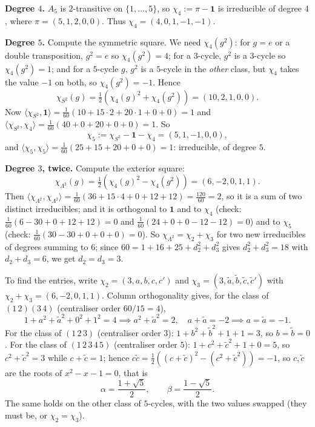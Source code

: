 \documentclass[a4paper]{scrartcl}
\newcommand{\ip}[2]{\langle #1, #2 \rangle}
\begin{document}
\textbf{Degree $4$.} $A_5$ is $2$-transitive on $\{1,\dots,5\}$, so $\chi_4 := \pi - \mathbf 1$ is irreducible of degree $4$, where $\pi = (5,1,2,0,0)$. Thus $\chi_4 = (4,0,1,-1,-1)$.

\textbf{Degree $5$.} Compute the symmetric square. We need $\chi_4(g^2)$: for $g = e$ or a double transposition, $g^2 = e$ so $\chi_4(g^2) = 4$; for a $3$-cycle, $g^2$ is a $3$-cycle so $\chi_4(g^2) = 1$; and for a $5$-cycle $g$, $g^2$ is a $5$-cycle in the \emph{other} class, but $\chi_4$ takes the value $-1$ on both, so $\chi_4(g^2) = -1$. Hence
$$\chi_{S^2}(g) = \tfrac12(\chi_4(g)^2 + \chi_4(g^2)) = (10, 2, 1, 0, 0).$$
Now $\ip{\chi_{S^2}}{\mathbf 1} = \frac1{60}(10 + 15\cdot2 + 20\cdot 1 + 0 + 0) = 1$ and $\ip{\chi_{S^2}}{\chi_4} = \frac1{60}(40 + 0 + 20 + 0 + 0) = 1$. So
$$\chi_5 := \chi_{S^2} - \mathbf 1 - \chi_4 = (5,1,-1,0,0),$$
and $\ip{\chi_5}{\chi_5} = \frac1{60}(25 + 15 + 20 + 0 + 0) = 1$: irreducible, of degree $5$.

\textbf{Degree $3$, twice.} Compute the exterior square:
$$\chi_{\Lambda^2}(g) = \tfrac12(\chi_4(g)^2 - \chi_4(g^2)) = (6,-2,0,1,1).$$
Then $\ip{\chi_{\Lambda^2}}{\chi_{\Lambda^2}} = \frac1{60}(36 + 15\cdot 4 + 0 + 12 + 12) = \frac{120}{60} = 2$, so it is a sum of two distinct irreducibles; and it is orthogonal to $\mathbf 1$ and to $\chi_4$ (check: $\frac1{60}(6 - 30 + 0 + 12+12) = 0$ and $\frac1{60}(24 + 0 + 0 - 12 - 12) = 0$) and to $\chi_5$ (check: $\frac1{60}(30 - 30 + 0 + 0 + 0) = 0$). So $\chi_{\Lambda^2} = \chi_2 + \chi_3$ for two new irreducibles of degrees summing to $6$; since $60 = 1 + 16+25+d_2^2+d_3^2$ gives $d_2^2+d_3^2 = 18$ with $d_2+d_3 = 6$, we get $d_2 = d_3 = 3$.

To find the entries, write $\chi_2 = (3,a,b,c,c')$ and $\chi_3 = (3,\tilde a,\tilde b,\tilde c,\tilde c')$ with $\chi_2+\chi_3 = (6,-2,0,1,1)$. Column orthogonality gives, for the class of $(1\,2)(3\,4)$ (centraliser order $60/15 = 4$),
$$1 + a^2+\tilde a^2 + 0^2 + 1^2 = 4 \implies a^2 + \tilde a^2 = 2, \quad a + \tilde a = -2 \implies a = \tilde a = -1.$$
For the class of $(1\,2\,3)$ (centraliser order $3$): $1 + b^2+\tilde b^2 + 1 + 1 = 3$, so $b = \tilde b = 0$. For the class of $(1\,2\,3\,4\,5)$ (centraliser order $5$): $1 + c^2 + \tilde c^2 + 1 + 0 = 5$, so $c^2+\tilde c^2 = 3$ while $c + \tilde c = 1$; hence $c\tilde c = \frac12((c+\tilde c)^2 - (c^2+\tilde c^2)) = -1$, so $c,\tilde c$ are the roots of $x^2 - x - 1 = 0$, that is
$$\alpha = \frac{1+\sqrt5}{2}, \qquad \beta = \frac{1-\sqrt5}{2}.$$
The same holds on the other class of $5$-cycles, with the two values swapped (they must be, or $\chi_2 = \chi_3$).
\end{document}
